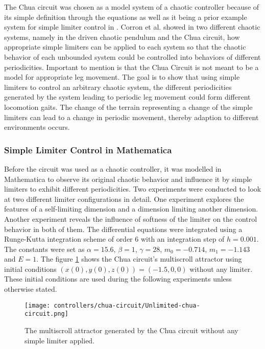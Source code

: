 \documentclass[main]{subfiles}
\begin{document}
The Chua circuit was chosen as a model system of a chaotic controller because of its simple definition through the equations as well as it being a prior example system for simple limiter control in \cite{bib:Corron2000}. %
%
Corron et al. showed in two different chaotic systems, namely in the driven chaotic pendulum and the Chua circuit, how appropriate simple limiters can be applied to each system so that the chaotic behavior of each unbounded system could be controlled into behaviors of different periodicities. %
%
Important to mention is that the Chua Circuit is not meant to be a model for appropriate leg movement. %
%
The goal is to show that using simple limiters to control an arbitrary chaotic system, the different periodicities generated by the system leading to periodic leg movement could form different locomotion gaits. %
%
The change of the terrain representing a change of the simple limiters can lead to a change in periodic movement, thereby adaption to different environments occurs. 

\subsubsection{Simple Limiter Control in Mathematica}
\label{subsubsec:simple-limiter-mathematica}

Before the circuit was used as a chaotic controller, it was modelled in Mathematica to observe its original chaotic behavior and influence it by simple limiters to exhibit different periodicities. %
%
Two experiments were conducted to look at two different limiter configurations in detail. %
%
One experiment explores the features of a self-limiting dimension and a dimension limiting another dimension. %
%
Another experiment reveals the influence of softness of the limiter on the control behavior in both of them. %
%
The differential equations were integrated using a Runge-Kutta integration scheme of order 6 with an integration step of \(h=0.001\). %
%
The constants were set as \(\alpha = 15.6\), \(\beta = 1\), \(\gamma = 28\), \(m_0 = -0.714\), \(m_1 = -1.143\) and \(E = 1\). %
%
The figure \ref{figure:chaoticchuacircuit} shows the Chua circuit's multiscroll attractor using initial conditions \((x(0),y(0),z(0)) = (-1.5,0,0)\) without any limiter. %
%
These initial conditions are used during the following experiments unless otherwise stated.

\begin{figure}[H]
\centering
\texttt{[image: controllers/chua-circuit/Unlimited-chua-circuit.png]}
\caption[The multiscroll attractor in the Chua circuit]{The multiscroll attractor generated by the Chua circuit without any simple limiter applied.}
\label{figure:chaoticchuacircuit}
\end{figure}
\end{document}
